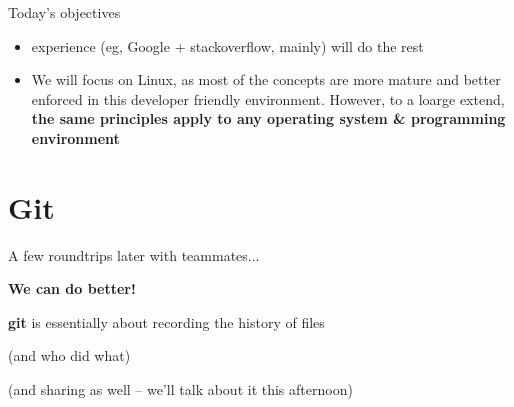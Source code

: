 \documentclass[compress]{beamer}
\begin{document}
\begin{frame}{Today's objectives}
{\begin{itemize}
            \item experience (eg, Google + stackoverflow, mainly) will do the rest

            \item We will focus on Linux, as most of the concepts are more
                mature and better enforced in this developer friendly
                environment. However, to a loarge extend, {\bf the same
                principles apply to any operating system \& programming
                environment}

        \end{itemize}

    }
\end{frame}



\section{Git}



\begin{frame}[plain]
    A few roundtrips later with teammates...
\end{frame}


{
    \begin{frame}[plain]{}
    \end{frame}
}


\begin{frame}{}
    \begin{center}
        \textbf{We can do better!}
    \end{center}
    \pause

    \textbf{git} is essentially about recording the history of files
    \pause

    (and who did what)
    \pause

    (and sharing as well -- we'll talk about it this afternoon)
\end{frame}
\end{document}
